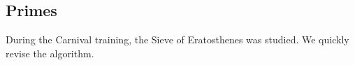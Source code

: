 \subsection{Primes}
During the Carnival training, the Sieve of Eratosthenes was studied. We quickly revise the algorithm.
